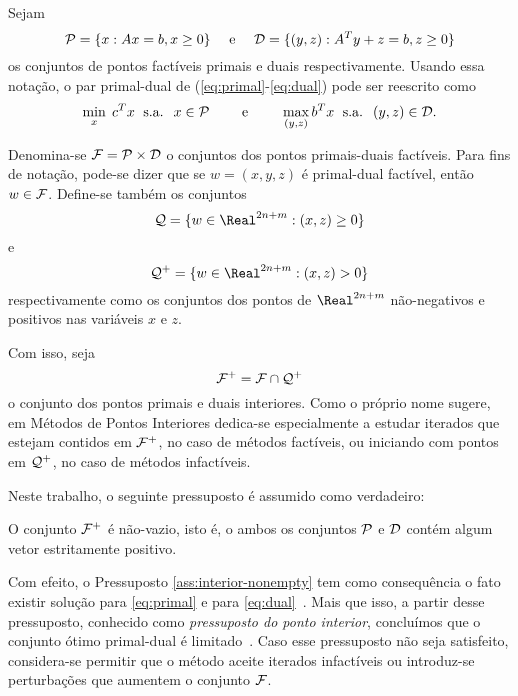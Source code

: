 Sejam
\begin{equation}
\label{eq:primal-dual-feas-set}
\mathcal{P} = \{x : Ax = b, x\geq 0\} \quad\text{ e } \quad
\mathcal{D} = \{ (y,z) : A^Ty + z = b, z\geq 0\}
\end{equation}
 os conjuntos de pontos factíveis primais e duais 
respectivamente. Usando essa notação, o par primal-dual de
(\ref{eq:primal}-\ref{eq:dual}) pode ser reescrito como
\begin{equation}
\label{eq:primal-dual-reescrito}
\min_x\; c^Tx \; \text{ s.a. }\; x\in \mathcal{P} \qquad\text{ e } \qquad
\max_{(y,z)}
b^Tx \; \text{ s.a. }\; (y,z) \in \mathcal{D}.
\end{equation}


Denomina-se $\mathcal{F} = \mathcal{P}\times\mathcal{D}$ o conjuntos dos pontos primais-duais
factíveis.
 Para fins de notação, pode-se dizer que se  $w = (x,y,z)$ é primal-dual factível, então $w\in\mathcal{F}$. Define-se também os conjuntos \[ \Qset =
 \{w\in\Real^{2n+m}:(x,z)\geq 0\} \] e \[ \Qset^+ = \{w\in\Real^{2n+m}:(x,z) >
 0\} \] respectivamente  como os
conjuntos dos pontos de $\Real^{2n+m}$ não-negativos e positivos nas variáveis
$x$ e $z$.



Com isso, seja
\begin{equation}
  	\label{eq:F+}
  	\mathcal{F}^+ = \mathcal{F} \cap \mathcal{Q}^+
  \end{equation}   o conjunto dos
pontos primais e duais interiores. Como o próprio nome sugere, em Métodos de 
Pontos Interiores dedica-se especialmente a estudar iterados que estejam
contidos em $\mathcal{F}^+$, no caso de métodos factíveis, ou iniciando com pontos em $\mathcal{Q}^{+}$, no caso de métodos infactíveis. 


Neste trabalho, o seguinte pressuposto é assumido como verdadeiro:

\begin{pressup}\label{ass:interior-nonempty}
 O conjunto $\mathcal{F}^+$ é não-vazio, isto é, o ambos os conjuntos $\mathcal{P}$ e
 $\mathcal{D}$ contém algum vetor estritamente positivo.
\end{pressup}




Com efeito,   o Pressuposto \ref{ass:interior-nonempty} tem como
consequência o fato existir  solução para
\eqref{eq:primal} e para \eqref{eq:dual}~\cite[Teorema 3.1]{Guler:1995wf}.
Mais que isso, a partir desse pressuposto, conhecido como \emph{pressuposto do
ponto interior}, concluímos que o conjunto ótimo primal-dual  é
limitado~\cite[Lema 2.2]{Guler:1995tn}.  Caso
esse pressuposto não seja satisfeito, considera-se permitir que o método aceite
iterados infactíveis ou introduz-se perturbações que aumentem o conjunto
$\mathcal{F}$.

